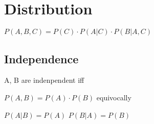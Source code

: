 \section{Distribution}

  $ P(A, B, C) = P(C) \cdot P(A | C) \cdot P(B | A, C) $

  \subsection{Independence}

    A, B are indenpendent iff

    $ P(A, B) = P(A) \cdot P(B) $ equivocally

    $ P(A|B) = P(A) $
    $ P(B|A) = P(B) $